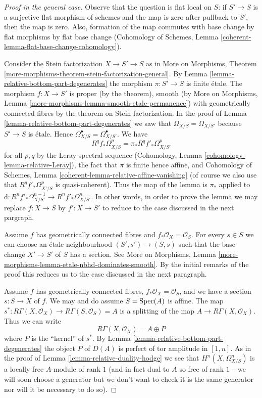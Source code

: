 \begin{proof}[Proof in the general case]
Observe that the question is flat local on $S$: if $S' \to S$ is a surjective
flat morphism of schemes and the map is zero after pullback to $S'$,
then the map is zero. Also, formation of the map commutes with base change
by flat morphisms by flat base change (Cohomology of Schemes, Lemma
\ref{coherent-lemma-flat-base-change-cohomology}).

\medskip\noindent
Consider the Stein factorization $X \to S' \to S$ as in
More on Morphisms, Theorem
\ref{more-morphisms-theorem-stein-factorization-general}.
By Lemma \ref{lemma-relative-bottom-part-degenerates} the morphism
$\pi : S' \to S$ is finite \'etale.
The morphism $f : X \to S'$ is proper (by the theorem),
smooth (by More on Morphisms, Lemma
\ref{more-morphisms-lemma-smooth-etale-permanence}) with geometrically
connected fibres by the theorem on Stein factorization.
In the proof of Lemma \ref{lemma-relative-bottom-part-degenerates}
we saw that $\Omega_{X/S} = \Omega_{X/S'}$ because $S' \to S$ is \'etale.
Hence $\Omega^\bullet_{X/S} = \Omega^\bullet_{X/S'}$.
We have
$$
R^qf_*\Omega^p_{X/S} = \pi_*R^qf'_*\Omega^p_{X/S'}
$$
for all $p, q$ by the Leray spectral sequence
(Cohomology, Lemma \ref{cohomology-lemma-relative-Leray}),
the fact that $\pi$ is finite hence affine, and
Cohomology of Schemes, Lemma \ref{coherent-lemma-relative-affine-vanishing}
(of course we also use that $R^qf'_*\Omega^p_{X'/S}$ is
quasi-coherent).
Thus the map of the lemma is $\pi_*$ applied to
$\text{d} : R^nf'_*\Omega^{n - 1}_{X/S'} \to R^nf'_*\Omega^n_{X/S'}$.
In other words, in order to prove the lemma we may replace
$f : X \to S$ by $f' : X \to S'$ to reduce to the case discussed
in the next pargraph.

\medskip\noindent
Assume $f$ has geometrically connected fibres and
$f_*\mathcal{O}_X = \mathcal{O}_S$.
For every $s \in S$ we can choose an \'etale neighbourhood
$(S', s') \to (S, s)$ such that the base change $X' \to S'$ of $S$
has a section. See More on Morphisms, Lemma
\ref{more-morphisms-lemma-etale-nbhd-dominates-smooth}.
By the initial remarks of the proof this reduces us to the case
discussed in the next paragraph.

\medskip\noindent
Assume $f$ has geometrically connected fibres,
$f_*\mathcal{O}_X = \mathcal{O}_S$, and we have
a section $s : S \to X$ of $f$. We may and do assume $S = \mathop{\mathrm{Spec}}(A)$
is affine. The map
$s^* : R\Gamma(X, \mathcal{O}_X) \to R\Gamma(S, \mathcal{O}_S) = A$
is a splitting of the map $A \to R\Gamma(X, \mathcal{O}_X)$. Thus we can write
$$
R\Gamma(X, \mathcal{O}_X) = A \oplus P
$$
where $P$ is the ``kernel'' of $s^*$. By
Lemma \ref{lemma-relative-bottom-part-degenerates} the object $P$
of $D(A)$ is perfect of tor amplitude in $[1, n]$. As in the proof
of Lemma \ref{lemma-relative-duality-hodge} we see that
$H^n(X, \Omega^n_{X/S})$ is a locally free $A$-module of rank $1$
(and in fact dual to $A$ so free of rank $1$ -- we will soon choose
a generator but we don't want to check it is the same generator
nor will it be necessary to do so).


\end{proof}
